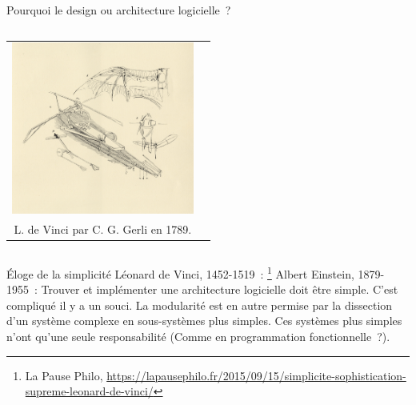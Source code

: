 \documentclass{beamer}
\begin{document}
    \begin{frame}{Pourquoi le design ou architecture logicielle~?}
        \begin{columns}
            \footnotemark
            \centering
            \centering
            \begin{tabular}{cc}
                \includegraphics[width=6.0cm]{image/da-vinci-plans} \\
                L. de Vinci par C. G. Gerli en 1789.                \\
            \end{tabular}
        \end{columns}
    \end{frame}

    \begin{frame}{Éloge de la simplicité}
        Léonard de Vinci, 1452-1519~: \footnote{La Pause Philo, \url{https://lapausephilo.fr/2015/09/15/simplicite-sophistication-supreme-leonard-de-vinci/}}
        \bigbreak
        Albert Einstein, 1879-1955~: 
        \bigbreak
        Trouver et implémenter une architecture logicielle doit être simple.
        C'est compliqué il y a un souci.
        \bigbreak La modularité est en autre permise par la dissection d'un système complexe en sous-systèmes plus simples.
        Ces systèmes plus simples n'ont qu'une seule responsabilité (Comme en programmation fonctionnelle~?).
    \end{frame}
\end{document}
